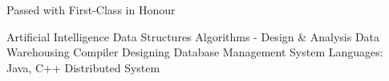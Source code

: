 Passed with First-Class in Honour


Artificial Intelligence \textbullet{} Data Structures \textbullet{} Algorithms - Design \& Analysis \textbullet{} Data Warehousing \textbullet{} Compiler Designing \textbullet{} Database Management System \textbullet{} Languages: Java, C++ \textbullet{} Distributed System